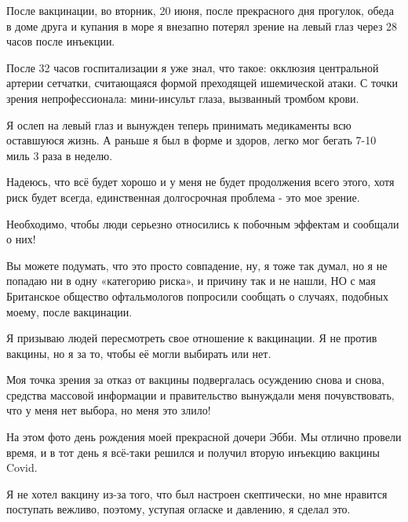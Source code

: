 После вакцинации, во вторник, 20 июня, после прекрасного дня прогулок, обеда в
доме друга и купания в море я внезапно потерял зрение на левый глаз через 28
часов после инъекции.

После 32 часов госпитализации я уже знал, что такое: окклюзия центральной
артерии сетчатки, считающаяся формой преходящей ишемической атаки. С точки
зрения непрофессионала: мини-инсульт глаза, вызванный тромбом крови.

Я ослеп на левый глаз и вынужден теперь принимать медикаменты всю оставшуюся
жизнь. А раньше я был в форме и здоров, легко мог бегать 7-10 миль 3 раза в
неделю.

Надеюсь, что всё будет хорошо и у меня не будет продолжения всего этого, хотя
риск будет всегда, единственная долгосрочная проблема - это мое зрение.

Необходимо, чтобы люди серьезно относились к побочным эффектам и сообщали о них!

Вы можете подумать, что это просто совпадение, ну, я тоже так думал, но я не
попадаю ни в одну «категорию риска», и причину так и не нашли, НО с мая
Британское общество офтальмологов попросили сообщать о случаях, подобных моему,
после вакцинации.

Я призываю людей пересмотреть свое отношение к вакцинации. Я не против вакцины,
но я за то, чтобы её могли выбирать или нет.

Моя точка зрения за отказ от вакцины подвергалась осуждению снова и снова,
средства массовой информации и правительство вынуждали меня почувствовать, что у
меня нет выбора, но меня это злило!

На этом фото день рождения моей прекрасной дочери Эбби. Мы отлично провели
время, и в тот день я всё-таки решился и получил вторую инъекцию вакцины Covid.

Я не хотел вакцину из-за того, что был настроен скептически, но мне нравится
поступать вежливо, поэтому, уступая огласке и давлению, я сделал это.
